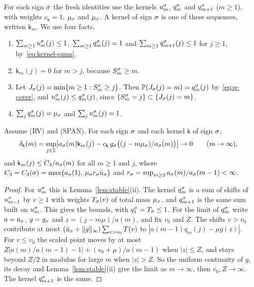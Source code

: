 For each sign $\sigma$ the fresh identities use the kernels $u^\sigma_m$, $q^\sigma_m$ and
$q^\sigma_{m+1}$ ($m\ge1$), with weights $c_{\mathsf k}=1$, $\mu_\sigma$ and $\mu_\sigma$. A
kernel of sign $\sigma$ is one of these sequences, written $\mathsf k_m$. We use four
facts.
\begin{enumerate}[(K1)]
\item $\sum_{m\ge1}u^\sigma_m(j)\le1$, $\sum_{m\ge1}q^\sigma_m(j)=1$ and
$\sum_{m\ge1}q^\sigma_{m+1}(j)\le1$ for $j\ge1$, by~\eqref{eq:kernel-sums}.
\item $\mathsf k_m(j)=0$ for $m>j$, because $S^\sigma_m\ge m$.
\item Let $J_\sigma(j)=\min\{m\ge1:S^\sigma_m\ge j\}$. Then $\mathbb{P}(J_\sigma(j)=m)=q^\sigma_m(j)$
by~\eqref{eq:q-cover}, and $u^\sigma_m(j)\le q^\sigma_m(j)$, since $\{S^\sigma_m=j\}\subset\{J_\sigma(j)=m\}$.
\item $\sum_jq^\sigma_m(j)=\mu_\sigma$ and $\sum_ju^\sigma_m(j)=1$.
\end{enumerate}

\begin{lemma}\label{lem:kernels}
Assume (RV) and (SPAN). For each sign $\sigma$ and each kernel $\mathsf k$ of sign $\sigma$,
\[
 \delta_{\mathsf k}(m)=\sup_{j\in\mathbb{Z}}\bigl|a_\sigma(m)\mathsf k_m(j)-c_{\mathsf k}\,g_\sigma\bigl((j-m\mu_\sigma)/a_\sigma(m)\bigr)\bigr|\to0
 \qquad(m\to\infty),
\]
and $\mathsf k_m(j)\le C_3/a_\sigma(m)$ for all $m\ge1$ and $j$, where
$C_3=C_3(\sigma)=\max\bigl(a_\sigma(1),\,\mu_\sigma r_\sigma\bar u_\sigma\bigr)$ and
$r_\sigma=\sup_{m\ge2}a_\sigma(m)/a_\sigma(m-1)<\infty$.
\end{lemma}

\begin{proof}
For $u^\sigma_m$ this is Lemma~\ref{lem:stable}(ii). The kernel $q^\sigma_m$ is a sum of
shifts of $u^\sigma_{m-1}$ by $v\ge1$ with weights $T_\sigma(v)$ of total mass $\mu_\sigma$, and
$q^\sigma_{m+1}$ is the same sum built on $u^\sigma_m$. This gives the bounds, with
$q^\sigma_1=T_\sigma\le1$. For the limit of $q^\sigma_m$ write $a=a_\sigma$, $g=g_\sigma$ and
$z=(j-m\mu)/a(m)$, and fix $v_0$ and $Z$. The shifts $v>v_0$ contribute at most
$(\bar u_\sigma+\|g\|_\infty)\sum_{v>v_0}T(v)$ to $|a(m-1)q_m(j)-\mu g(z)|$. For $v\le v_0$
the scaled point moves by at most $Z|a(m)/a(m-1)-1|+(v_0+\mu)/a(m-1)$ when $|z|\le Z$,
and stays beyond $Z/2$ in modulus for large $m$ when $|z|>Z$. So the uniform continuity
of $g$, its decay and Lemma~\ref{lem:stable}(ii) give the limit as $m\to\infty$, then
$v_0,Z\to\infty$. The kernel $q^\sigma_{m+1}$ is the same.
\end{proof}

